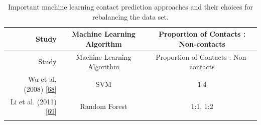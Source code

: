 \documentclass[11pt,a4paper,twoside]{book}
\theoremstyle{definition}
\theoremstyle{definition}
\theoremstyle{remark}
\begin{document}
\begin{longtable}[]{@{}rcc@{}}
\caption{\label{tab:rebalancing-dataset} Important machine learning contact
prediction approaches and their choices for rebalancing the data
set.}\tabularnewline
\toprule
\begin{minipage}[b]{0.32\columnwidth}\raggedleft\strut
Study\strut
\end{minipage} & \begin{minipage}[b]{0.19\columnwidth}\centering\strut
Machine Learning Algorithm\strut
\end{minipage} & \begin{minipage}[b]{0.29\columnwidth}\centering\strut
Proportion of Contacts : Non-contacts\strut
\end{minipage}\tabularnewline
\midrule
\endfirsthead
\toprule
\begin{minipage}[b]{0.32\columnwidth}\raggedleft\strut
Study\strut
\end{minipage} & \begin{minipage}[b]{0.19\columnwidth}\centering\strut
Machine Learning Algorithm\strut
\end{minipage} & \begin{minipage}[b]{0.29\columnwidth}\centering\strut
Proportion of Contacts : Non-contacts\strut
\end{minipage}\tabularnewline
\midrule
\endhead
\begin{minipage}[t]{0.32\columnwidth}\raggedleft\strut
Wu et al. (2008) {[}\protect\hyperlink{ref-Wu2008}{68}{]}\strut
\end{minipage} & \begin{minipage}[t]{0.19\columnwidth}\centering\strut
SVM\strut
\end{minipage} & \begin{minipage}[t]{0.29\columnwidth}\centering\strut
1:4\strut
\end{minipage}\tabularnewline
\begin{minipage}[t]{0.32\columnwidth}\raggedleft\strut
Li et al. (2011) {[}\protect\hyperlink{ref-Li2011}{69}{]}\strut
\end{minipage} & \begin{minipage}[t]{0.19\columnwidth}\centering\strut
Random Forest\strut
\end{minipage} & \begin{minipage}[t]{0.29\columnwidth}\centering\strut
1:1, 1:2\strut
\end{minipage}\tabularnewline
\begin{minipage}[t]{0.32\columnwidth}\raggedleft\strut

\end{minipage}
\end{longtable}
\end{document}
